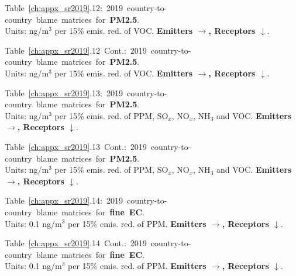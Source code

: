 \footnotesize{\mbox{Table \ref{ch:appx_sr2019}.12: 2019 country-to-country blame matrices for \textbf{PM2.5}.}\\ Units: ng/m$^3$ per 15\% emis. red. of VOC. \textbf{Emitters $\rightarrow$, Receptors $\downarrow$}. }\\[\baselineskip]\enlargethispage{\myenlarge} \hspace{-0.5cm} 
\centerline{}\clearpage
\footnotesize{\mbox{Table \ref{ch:appx_sr2019}.12 Cont.: 2019 country-to-country blame matrices for \textbf{PM2.5}.}\\ Units: ng/m$^3$ per 15\% emis. red. of VOC. \textbf{Emitters $\rightarrow$, Receptors $\downarrow$}. }\\[\baselineskip]\enlargethispage{\myenlarge} \hspace{-0.5cm} 
\centerline{}\clearpage



\footnotesize{\mbox{Table \ref{ch:appx_sr2019}.13: 2019 country-to-country blame matrices for \textbf{PM2.5}.}\\ Units: ng/m$^3$ per 15\% emis. red. of PPM, SO$_x$, NO$_x$, NH$_3$ and VOC. \textbf{Emitters $\rightarrow$, Receptors $\downarrow$}. }\\[\baselineskip]\enlargethispage{\myenlarge} \hspace{-0.5cm} 
\centerline{}\clearpage
\footnotesize{\mbox{Table \ref{ch:appx_sr2019}.13 Cont.: 2019 country-to-country blame matrices for \textbf{PM2.5}.}\\ Units: ng/m$^3$ per 15\% emis. red. of PPM, SO$_x$, NO$_x$, NH$_3$ and VOC. \textbf{Emitters $\rightarrow$, Receptors $\downarrow$}. }\\[\baselineskip]\enlargethispage{\myenlarge} \hspace{-0.5cm} 
\centerline{}\clearpage



 \footnotesize{\mbox{Table \ref{ch:appx_sr2019}.14: 2019
     country-to-country blame matrices for \textbf{fine EC}.}\\ Units:
   0.1 ng/m$^3$ per 15\% emis. red. of PPM. \textbf{Emitters $\rightarrow$, Receptors $\downarrow$}. }\\[\baselineskip]\enlargethispage{\myenlarge} \hspace{-0.5cm} 
 \centerline{}\clearpage
 \footnotesize{\mbox{Table \ref{ch:appx_sr2019}.14 Cont.: 2019
     country-to-country blame matrices for \textbf{fine EC}.}\\ Units:
   0.1 ng/m$^3$ per 15\% emis. red. of PPM. \textbf{Emitters $\rightarrow$, Receptors $\downarrow$}. }\\[\baselineskip]\enlargethispage{\myenlarge} \hspace{-0.5cm} 
 \centerline{}\clearpage



